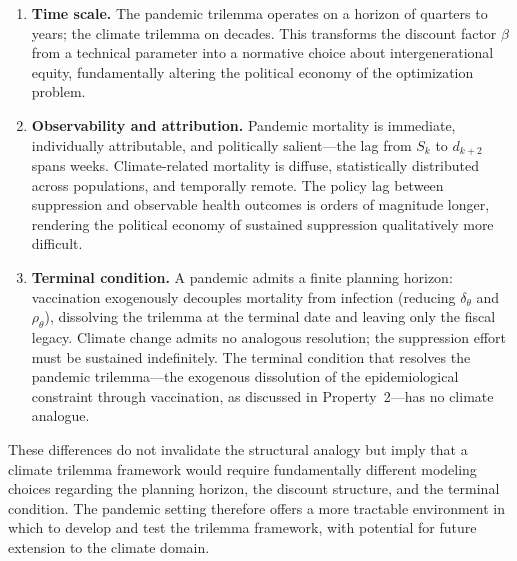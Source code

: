 \documentclass[12pt, a4paper]{article}
\begin{document}
\begin{enumerate}
    \item \textbf{Time scale.} The pandemic trilemma operates on a horizon of quarters to years; the climate trilemma on decades. This transforms the discount factor $\beta$ from a technical parameter into a normative choice about intergenerational equity, fundamentally altering the political economy of the optimization problem.

    \item \textbf{Observability and attribution.} Pandemic mortality is immediate, individually attributable, and politically salient---the lag from $S_k$ to $d_{k+2}$ spans weeks. Climate-related mortality is diffuse, statistically distributed across populations, and temporally remote. The policy lag between suppression and observable health outcomes is orders of magnitude longer, rendering the political economy of sustained suppression qualitatively more difficult.

    \item \textbf{Terminal condition.} A pandemic admits a finite planning horizon: vaccination exogenously decouples mortality from infection (reducing $\delta_\theta$ and $\rho_\theta$), dissolving the trilemma at the terminal date and leaving only the fiscal legacy. Climate change admits no analogous resolution; the suppression effort must be sustained indefinitely. The terminal condition that resolves the pandemic trilemma---the exogenous dissolution of the epidemiological constraint through vaccination, as discussed in Property~2---has no climate analogue.
\end{enumerate}

\noindent These differences do not invalidate the structural analogy but imply that a climate trilemma framework would require fundamentally different modeling choices regarding the planning horizon, the discount structure, and the terminal condition. The pandemic setting therefore offers a more tractable environment in which to develop and test the trilemma framework, with potential for future extension to the climate domain.
\end{document}
